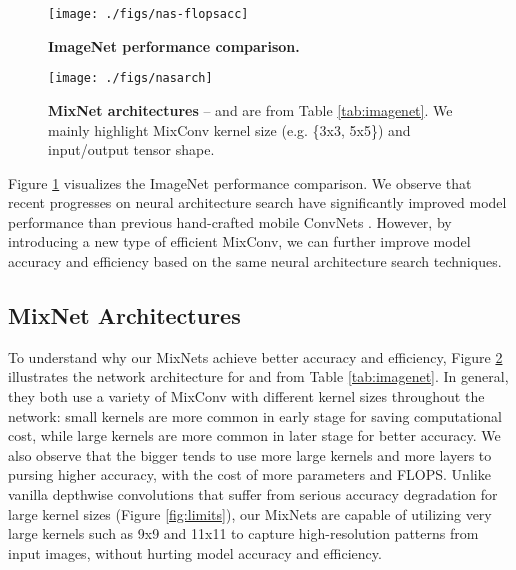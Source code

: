 \documentclass{sty/bmvc2k}
\begin{document}
\begin{figure}[t]
	\centering 
	\texttt{[image: ./figs/nas-flopsacc]}
	\vskip -0.1in
	\caption{
		\textbf{ImageNet performance comparison.}
	}
	\label{fig:nasflopsparams}
\end{figure} \begin{figure}                                           
	\centering                                                                  
	\texttt{[image: ./figs/nasarch]}
	\vskip -0.1in
	\caption{
		\textbf{MixNet architectures} --   and  are from Table \ref{tab:imagenet}. We mainly highlight MixConv kernel size (e.g. \{3x3, 5x5\}) and input/output tensor shape.
	}
	\label{fig:nasarch}
\end{figure} 
Figure \ref{fig:nasflopsparams} visualizes the ImageNet performance comparison. We observe that recent progresses on neural architecture search have significantly improved model performance \cite{mnas19,fbnet19,proxyless19} than previous hand-crafted mobile ConvNets \cite{mobilenetv218,shufflenetv218}. However, by introducing a new type of efficient MixConv, we can further improve model accuracy and efficiency based on the same neural architecture search techniques.

\subsection{MixNet Architectures}

To understand why our MixNets achieve better accuracy and efficiency, Figure \ref{fig:nasarch} illustrates the network architecture for  and  from Table \ref{tab:imagenet}. In general, they both use a variety of MixConv with different kernel sizes throughout the network: small kernels are more common in early stage for saving computational cost, while large kernels are more common in later stage for better accuracy. We also observe that the bigger  tends to use more large kernels and more layers to pursing higher accuracy, with the cost of more parameters and FLOPS. Unlike vanilla depthwise convolutions that suffer from serious accuracy degradation for large kernel sizes (Figure \ref{fig:limits}), our MixNets are capable of utilizing very large kernels such as 9x9 and 11x11 to capture high-resolution patterns from input images,  without hurting model accuracy and efficiency.
\end{document}
